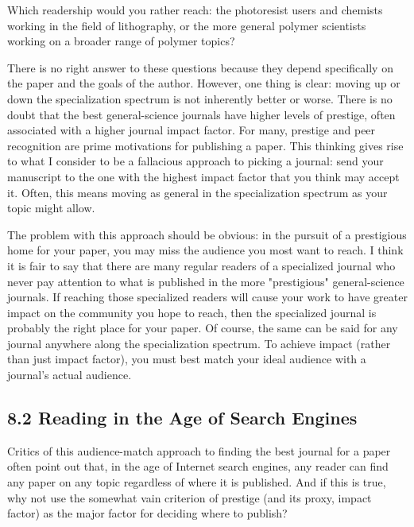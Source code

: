 Which readership would you rather reach: the photoresist users and chemists working in the field of lithography, or the more general polymer scientists working on a broader range of polymer topics?

There is no right answer to these questions because they depend specifically on the paper and the goals of the author. However, one thing is clear: moving up or down the specialization spectrum is not inherently better or worse. There is no doubt that the best general-science journals have higher levels of prestige, often associated with a higher journal impact factor. For many, prestige and peer recognition are prime motivations for publishing a paper. This thinking gives rise to what I consider to be a fallacious approach to picking a journal: send your manuscript to the one with the highest impact factor that you think may accept it. Often, this means moving as general in the specialization spectrum as your topic might allow.

The problem with this approach should be obvious: in the pursuit of a prestigious home for your paper, you may miss the audience you most want to reach. I think it is fair to say that there are many regular readers of a specialized journal who never pay attention to what is published in the more "prestigious" general-science journals. If reaching those specialized readers will cause your work to have greater impact on the community you hope to reach, then the specialized journal is probably the right place for your paper. Of course, the same can be said for any journal anywhere along the specialization spectrum. To achieve impact (rather than just impact factor), you must best match your ideal audience with a journal's actual audience.

\subsection*{8.2 Reading in the Age of Search Engines}
Critics of this audience-match approach to finding the best journal for a paper often point out that, in the age of Internet search engines, any reader can find any paper on any topic regardless of where it is published. And if this is true, why not use the somewhat vain criterion of prestige (and its proxy, impact factor) as the major factor for deciding where to publish?

